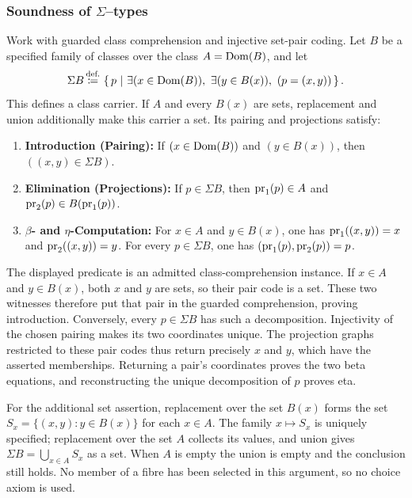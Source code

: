 \subsubsection{Soundness of $\Sigma$--types}
\begin{theorem}
\label{thm:sigma_carrier_model}
Work with guarded class comprehension and injective set-pair coding.
Let $B$ be a specified family of classes over the class
$A=\mathrm{Dom}(B)$, and let
\[
\Sigma B \eqdef \cc{p}{\exists (x \in \Dom(B)),\ \exists (y \in B(x)),\ (p = (x, y))}.
\]
This defines a class carrier. If $A$ and every $B(x)$ are sets,
replacement and union additionally make this carrier a set.
Its pairing and projections satisfy:
\begin{enumerate}
\item \textbf{Introduction (Pairing):} If $(x \in \mathrm{Dom}(B))$ and $(y \in B(x))$, then $((x, y) \in \Sigma B)$.
\item \textbf{Elimination (Projections):} If $p\in\Sigma B$, then
$\mathrm{pr}_1(p)\in A$ and $\mathrm{pr}_2(p)\in B(\mathrm{pr}_1(p))$.
\item \textbf{$\beta$- and $\eta$-Computation:} For $x\in A$ and
$y\in B(x)$, one has $\mathrm{pr}_1((x,y))=x$ and $\mathrm{pr}_2((x,y))=y$.
For every $p\in\Sigma B$, one has $(\mathrm{pr}_1(p),\mathrm{pr}_2(p))=p$.
\end{enumerate}
\end{theorem}
\Proof
The displayed predicate is an admitted class-comprehension instance.
If $x\in A$ and $y\in B(x)$, both $x$ and $y$ are sets, so their
pair code is a set. These two witnesses therefore put that pair in
the guarded comprehension, proving introduction. Conversely, every
$p\in\Sigma B$ has such a decomposition. Injectivity of the chosen
pairing makes its two coordinates unique. The projection graphs
restricted to these pair codes thus return precisely $x$ and $y$,
which have the asserted memberships. Returning a pair's coordinates
proves the two beta equations, and reconstructing the unique
decomposition of $p$ proves eta.

For the additional set assertion, replacement over the set $B(x)$
forms the set $S_x=\{(x,y):y\in B(x)\}$ for each $x\in A$.
The family $x\mapsto S_x$ is uniquely specified; replacement over
the set $A$ collects its values, and union gives
$\Sigma B=\bigcup_{x\in A}S_x$ as a set. When $A$ is empty the
union is empty and the conclusion still holds. No member of a fibre
has been selected in this argument, so no choice axiom is used.
\Done

